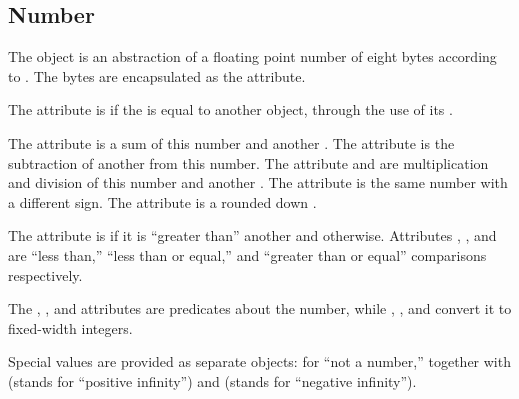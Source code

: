 
\subsection{Number}\label{sec:number}

The object  is an abstraction of a floating point number
  of eight bytes according to \citet{ieee754}.
The bytes are encapsulated as the  attribute.

The  attribute is  if the 
  is equal to another object, through the use of its .

The  attribute is a sum of this number and another .
The  attribute is the subtraction
  of another  from this number.
The  attribute and  are multiplication
  and division of this number and another .
The  attribute is the same number with a different sign.
The  attribute is a rounded down .

The  attribute is  if it is ``greater than''
  another  and  otherwise.
Attributes , , and  are ``less than,''
  ``less than or equal,'' and ``greater than or equal''
  comparisons respectively.

The , , and  attributes
  are predicates about the number, while , ,
  and  convert it to fixed-width integers.

Special values are provided as separate objects:  for
  ``not a number,'' together with  (stands for ``positive infinity'')
  and  (stands for ``negative infinity'').
